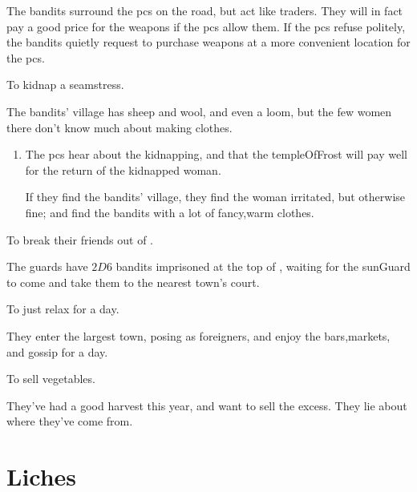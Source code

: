 \begin{multicols}{2}
\begin{dlistDouble}
  The bandits surround the \glspl{pc} on the road, but act like traders.
  They will in fact pay a good price for the weapons if the \glspl{pc} allow them.
  If the \glspl{pc} refuse politely, the bandits quietly request to purchase weapons at a more convenient location for the \glspl{pc}.
  \item
  To kidnap a seamstress.

  The bandits' \gls{village} has sheep and wool, and even a loom, but the few women there don't know much about making clothes.

  \begin{enumerate}
    \item
    The \glspl{pc} hear about the kidnapping, and that the \gls{templeOfFrost} will pay well for the return of the kidnapped woman.

    If they find the bandits' \gls{village}, they find the woman irritated, but otherwise fine; and find the bandits with a lot of fancy,warm clothes.
  \end{enumerate}
  \item
  To break their friends out of .

  The \glspl{guard} have $2D6$ bandits imprisoned at the top of , waiting for the \gls{sunGuard} to come and take them to the nearest town's \gls{court}.
  \item
  To just relax for a day.

  They enter the largest town, posing as foreigners, and enjoy the bars,markets, and gossip for a day.
  \item
  To sell vegetables.

  They've had a good harvest this year, and want to sell the excess.
  They lie about where they've come from.
\end{dlistDouble}

\end{multicols}

\section[Lich]{Liches}
\label{lich}

